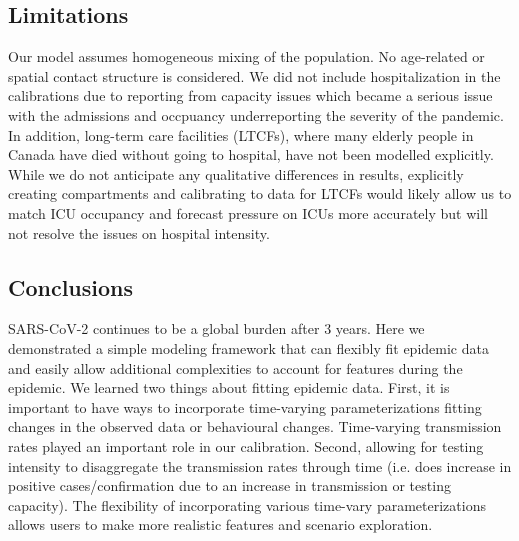 \documentclass[12pt]{article}\usepackage[]{graphicx}\usepackage[]{color}
\begin{document}
\subsection{Limitations}

Our model assumes homogeneous mixing of the population. 
No age-related or spatial contact structure is considered. 
We did not include hospitalization in the calibrations due to reporting from capacity issues which became a serious issue with the admissions and occpuancy underreporting the severity of the pandemic.
In addition, long-term care facilities (LTCFs), where many elderly people in Canada have died without going to hospital, have not been modelled explicitly.  
While we do not anticipate any qualitative differences in results, explicitly creating compartments and calibrating to data for LTCFs would likely allow us to match ICU occupancy and forecast
pressure on ICUs more accurately but will not resolve the issues on hospital intensity. 

\subsection{Conclusions}

SARS-CoV-2 continues to be a global burden after 3 years. 
Here we demonstrated a simple modeling framework that can flexibly fit epidemic data and easily allow additional complexities to account for features during the epidemic. 
We learned two things about fitting epidemic data. 
First, it is important to have ways to incorporate time-varying parameterizations fitting changes in the observed data or behavioural changes. Time-varying transmission rates played an important role in our calibration. 
Second, allowing for testing intensity to disaggregate the transmission rates through time (i.e. does increase in positive cases/confirmation due to an increase in transmission or testing capacity). 
The flexibility of incorporating various time-vary parameterizations allows users to make more realistic features and scenario exploration. 


\clearpage
\end{document}
